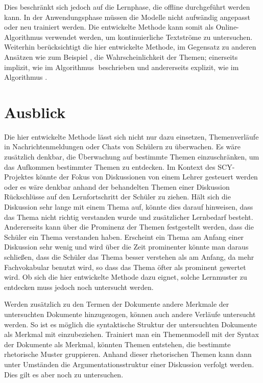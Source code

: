 Dies beschränkt sich jedoch auf die Lernphase, die offline durchgeführt werden kann. In der Anwendungsphase müssen die Modelle nicht aufwändig angepasst oder neu trainiert werden. Die entwickelte Methode kann somit als Online-Algorithmus verwendet werden, um kontinuierliche Textströme zu untersuchen. Weiterhin berücksichtigt die hier entwickelte Methode, im Gegensatz zu anderen Ansätzen wie zum Beispiel \citep{ldaSourceCode}, die Wahrscheinlichkeit der Themen; einerseits implizit, wie im Algorithmus \CDC$\;$beschrieben und andererseits explizit, wie im Algorithmus \TPR. 

\section{Ausblick}

Die hier entwickelte Methode lässt sich nicht nur dazu einsetzen, Themenverläufe in Nachrichtenmeldungen oder Chats von Schülern zu überwachen. Es wäre zusätzlich denkbar, die Überwachung auf bestimmte Themen einzuschränken, um das Aufkommen bestimmter Themen zu entdecken. Im Kontext des SCY-Projektes könnte der Fokus von Diskussionen von einem Lehrer gesteuert werden oder es wäre denkbar anhand der behandelten Themen einer Diskussion Rückschlüsse auf den Lernfortschritt der Schüler zu ziehen. Hält sich die Diskussion sehr lange mit einem Thema auf, könnte dies darauf hinweisen, dass das Thema nicht richtig verstanden wurde und zusätzlicher Lernbedarf besteht. Andererseits kann über die Prominenz der Themen festgestellt werden, dass die Schüler ein Thema verstanden haben. Erscheint ein Thema am Anfang einer Diskussion sehr wenig und wird über die Zeit prominenter könnte man daraus schließen, dass die Schüler das Thema besser verstehen als am Anfang, da mehr Fachvokabular benutzt wird, so dass das Thema öfter als prominent gewertet wird. Ob sich die hier entwickelte Methode dazu eignet, solche Lernmuster zu entdecken muss jedoch noch untersucht werden. 

Werden zusätzlich zu den Termen der Dokumente andere Merkmale der untersuchten Dokumente hinzugezogen, können auch andere Verläufe untersucht werden. So ist es möglich die syntaktische Struktur der untersuchten Dokumente als Merkmal mit einzubeziehen. Trainiert man ein Themenmodell mit der Syntax der Dokumente als Merkmal, könnten Themen entstehen, die bestimmte rhetorische Muster gruppieren. Anhand dieser rhetorischen Themen kann dann unter Umständen die Argumentationsstruktur einer Diskussion verfolgt werden. Dies gilt es aber noch zu untersuchen.

